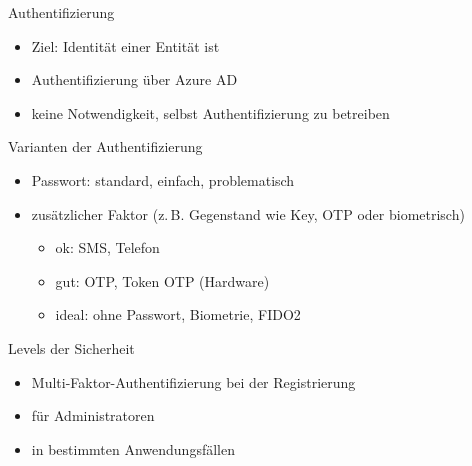 
\begin{flashcard}[Definition]{Authentifizierung}
  \begin{itemize}
    \item Ziel: Identität einer Entität ist 
    \item Authentifizierung über Azure AD
    \item keine Notwendigkeit, selbst Authentifizierung zu betreiben
  \end{itemize}
\end{flashcard}

\begin{flashcard}[Definition]{Varianten der Authentifizierung}
  \begin{itemize}
    \item Passwort: standard, einfach, problematisch
    \item zusätzlicher Faktor (z.\,B. Gegenstand wie Key, OTP oder biometrisch)
    \begin{itemize}
      \item ok: SMS, Telefon
      \item gut: OTP, Token OTP (Hardware)
      \item ideal: ohne Passwort, Biometrie, FIDO2
    \end{itemize}
  \end{itemize}
\end{flashcard}

\begin{flashcard}[Definition]{Levels der Sicherheit}
  \begin{itemize}
    \item Multi-Faktor-Authentifizierung bei der Registrierung
    \item für Administratoren
    \item in bestimmten Anwendungsfällen
  \end{itemize}
\end{flashcard}

